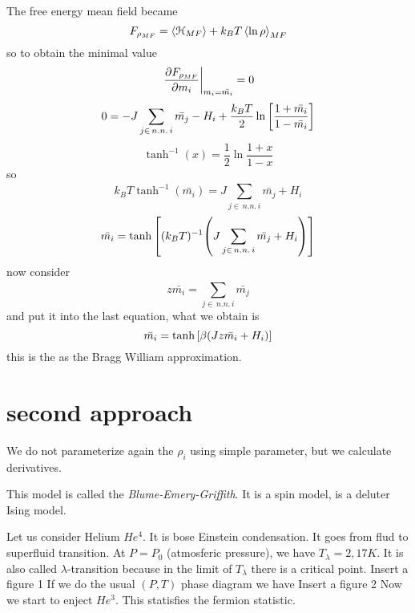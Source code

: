 \documentclass[../main/main.tex]{subfiles}
\begin{document}
The free energy mean field became
\begin{equation}
  F_{\rho _{MF}} = \expval{\mathcal{H}_{MF}} + k_B T \expval{\ln{\rho } }_{MF}
\end{equation}
so to obtain the minimal value
\begin{equation}
 \eval{ \pdv{F_{\rho _{MF}} }{m_i} }_{m_i = \bar{m_i} } = 0
\end{equation}
\begin{equation}
  0 = - J \sum_{j \in \, n.n. \, i}^{} \bar{m_j} - H_i + \frac{k_B T}{2} \ln{\qty[\frac{1+\bar{m_i} }{1- \bar{m_i} }] }
\end{equation}
\begin{equation}
  \tanh^{-1} (x) = \frac{1}{2} \ln{\frac{1+x}{1-x}}
\end{equation}
so
\begin{equation}
  k_B T \tanh^{-1} ( \bar{m_i} ) = J \sum_{j \in \, n.n. \, i}^{} \bar{m_j} + H_i
\end{equation}
\begin{equation}
  \bar{m_i} = \tanh \qty[(k_B T)^{-1} \qty(J \sum_{j \in \, n.n. \, i}^{} \bar{m_j} + H_i ) ]
\end{equation}
now consider
\begin{equation}
  z \bar{m_i} = \sum_{j \in \, n.n. \, i}^{} \bar{m_j}
\end{equation}
and put it into the last equation, what we obtain is
\begin{equation}
  \bar{m_i} = \tanh \qty[\beta \qty(Jz \bar{m_i} +H_i) ]
\end{equation}
this is the as the Bragg William approximation.

\section{second approach}
We do not parameterize again the \( \rho _i \)  using simple parameter, but we calculate derivatives.

This model is called the \emph{Blume-Emery-Griffith}. It is a spin model, is a deluter Ising model.

Let us consider Helium \( He^4 \). It is bose Einstein condensation. It goes from flud to superfluid transition. At \( P = P_0 \) (atmosferic pressure), we have \( T_{\lambda } = 2,17 K \). It is also called \( \lambda  \)-transition because in the limit of \(T_{\lambda }  \) there is a critical point.
Insert a figure 1
If we do the usual \( (P,T) \) phase diagram we have
Insert a figure 2
Now we start to enject \( He^3 \). This statisfies the fermion statistic.
\end{document}

